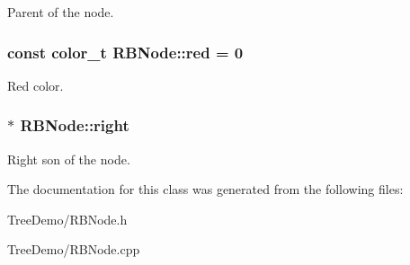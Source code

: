 Parent of the node. \hypertarget{class_r_b_node_a717168defd1a144e4d3987a52baebce4}{
\subsubsection[{red}]{\setlength{\rightskip}{0pt plus 5cm}const color\+\_\+t R\+B\+Node\+::red = 0\hspace{0.3cm}{\ttfamily [static]}}}\label{class_r_b_node_a717168defd1a144e4d3987a52baebce4}
Red color. \hypertarget{class_r_b_node_af82826872827c548a5713eb84f264767}{
\subsubsection[{right}]{$\ast$ R\+B\+Node\+::right}}\label{class_r_b_node_af82826872827c548a5713eb84f264767}
Right son of the node. 

The documentation for this class was generated from the following files\+:\begin{DoxyCompactItemize}
\item 
Tree\+Demo/R\+B\+Node.\+h\item 
Tree\+Demo/R\+B\+Node.\+cpp\end{DoxyCompactItemize}
